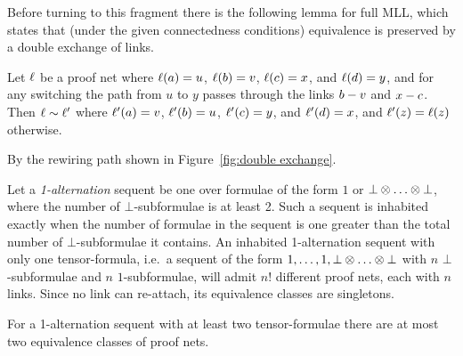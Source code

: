 \documentclass[conference]{IEEEtran}
\begin{document}
Before turning to this fragment there is the following lemma for full MLL, which states that (under the given connectedness conditions) equivalence is preserved by a double exchange of links.



\begin{lemma}
\label{lem:double exchange}
Let $\ell$ be a proof net where $\ell(a)=u$, $\ell(b)=v$, $\ell(c)=x$, and $\ell(d)=y$, and for any switching the path from $u$ to $y$ passes through the links $b-v$ and $x-c$.
%
Then $\links\perm\links'$ where $\ell'(a)=v$, $\ell'(b)=u$, $\ell'(c)=y$, and $\ell'(d)=x$, and $\ell'(z)=\ell(z)$ otherwise.
\end{lemma}

\begin{IEEEproof}
By the rewiring path shown in Figure~\ref{fig:double exchange}.
\end{IEEEproof}






Let a \emph{1-alternation} sequent be one over formulae of the form $1$ or $\bot\otimes\ldots\otimes\bot$, where the number of $\bot$-subformulae is at least 2.
%
Such a sequent is inhabited exactly when the number of formulae in the sequent is one greater than the total number of $\bot$-subformulae it contains.
%
An inhabited 1-alternation sequent with only one tensor-formula, i.e.\ a sequent of the form $1,\ldots,1,\bot\otimes\ldots\otimes\bot$ with $n$ $\bot$-subformulae and $n$ $1$-subformulae, will admit $n!$ different proof nets, each with $n$ links.
%
Since no link can re-attach, its equivalence classes are singletons.



\begin{proposition}
\label{prop:level0 max binary}
%
For a 1-alternation sequent with at least two tensor-formulae there are at most two equivalence classes of proof nets.
%
\end{proposition}
\end{document}
